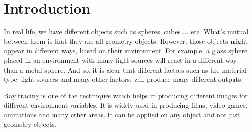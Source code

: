 \documentclass{article}
\begin{document}
	\section{Introduction}
	
	In real life, we have different objects such as spheres, cubes ... etc. What's mutual between them is that they are all geometry objects. However, those objects might appear in different ways, based on their environment. For example, a glass sphere placed in an environment with many light sources will react in a different way than a metal sphere. And so, it is clear that different factors such as the material type, light sources and many other factors, will produce many different outputs. \\
	\par Ray tracing is one of the techniques which helps in producing different images for different environment variables. It is widely used in producing films, video games, animations and many other areas. It can be applied on any object and not just geometry objects.
\end{document}
